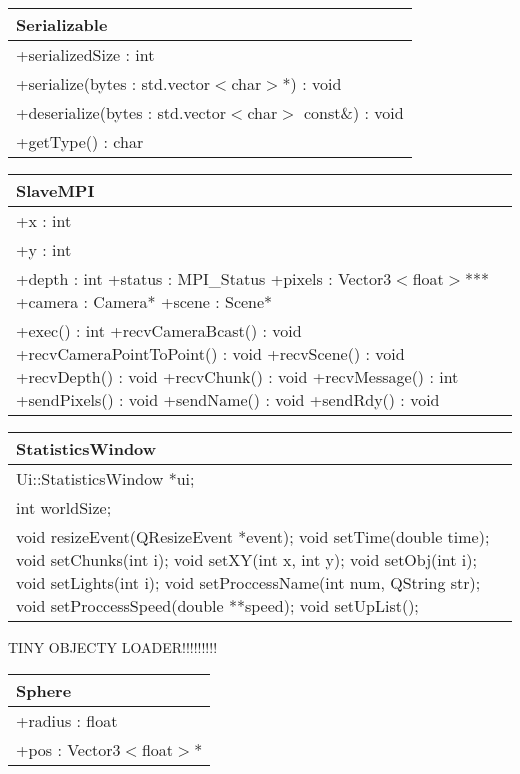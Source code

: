 \begin{center}
    \begin{tabular}{|l|}
    \hline
    Serializable \\ \hline
    +serializedSize : int \\ \hline
	+serialize(bytes : std.vector$<$char$>$*) : void \\ 
	+deserialize(bytes : std.vector$<$char$>$ const\&) : void \\
	+getType() : char \\
	\hline
    \end{tabular}
\end{center}

\begin{center}
    \begin{tabular}{|l|}
    \hline
    SlaveMPI \\ \hline
    +x : int \\ 
	+y : int \\
	+depth : int
	+status : MPI\_Status
	+pixels : Vector3$<$float$>$***
	+camera : Camera*
	+scene : Scene* \\ \hline
	+exec() : int
	+recvCameraBcast() : void
	+recvCameraPointToPoint() : void
	+recvScene() : void
	+recvDepth() : void
	+recvChunk() : void
	+recvMessage() : int
	+sendPixels() : void
	+sendName() : void
	+sendRdy() : void
    \end{tabular}
\end{center}

\begin{center}
    \begin{tabular}{|l|}
    \hline
    StatisticsWindow \\ \hline
    Ui::StatisticsWindow *ui; \\
    int worldSize; \\
    \hline
	void resizeEvent(QResizeEvent *event);
    void setTime(double time);
    void setChunks(int i);
    void setXY(int x, int y);
    void setObj(int i);
    void setLights(int i);
    void setProccessName(int num, QString str);
    void setProccessSpeed(double **speed);
    void setUpList();
    \hline
    \end{tabular}
\end{center}


TINY OBJECTY LOADER!!!!!!!!!

\begin{center}
    \begin{tabular}{|l|}
    \hline
    Sphere \\ \hline
    +radius : float \\
    +pos : Vector3$<$float$>$* \\
    \hline
    \end{tabular}
\end{center}

